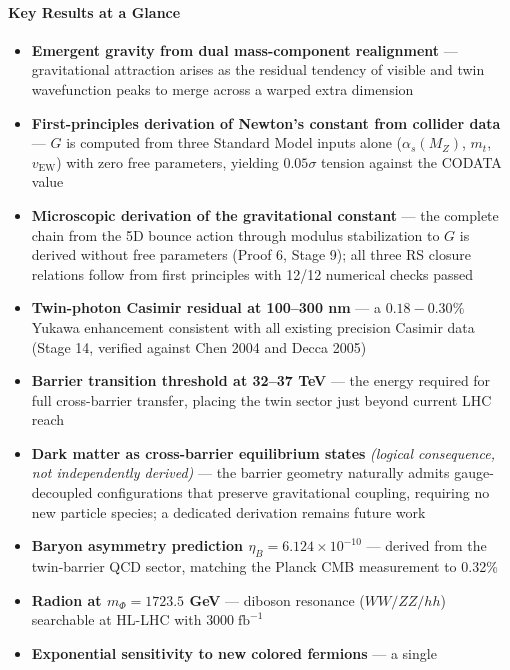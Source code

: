 \documentclass[
  11pt,
]{article}
\providecommand{\tightlist}{%
  \setlength{\itemsep}{0pt}\setlength{\parskip}{0pt}}
\begin{document}
\hypertarget{key-results-at-a-glance}{%
\paragraph{Key Results at a Glance}\label{key-results-at-a-glance}}

\begin{itemize}
\tightlist
\item
  \textbf{Emergent gravity from dual mass-component realignment} ---
  gravitational attraction arises as the residual tendency of visible
  and twin wavefunction peaks to merge across a warped extra dimension
\item
  \textbf{First-principles derivation of Newton's constant from collider
  data} --- \(G\) is computed from three Standard Model inputs alone
  (\(\alpha_s(M_Z)\), \(m_t\), \(v_{\text{EW}}\)) with zero free
  parameters, yielding \(0.05\sigma\) tension against the CODATA value
\item
  \textbf{Microscopic derivation of the gravitational constant} --- the
  complete chain from the 5D bounce action through modulus stabilization
  to \(G\) is derived without free parameters (Proof 6, Stage 9); all
  three RS closure relations follow from first principles with 12/12
  numerical checks passed
\item
  \textbf{Twin-photon Casimir residual at 100--300 nm} --- a
  \(0.18{-}0.30\%\) Yukawa enhancement consistent with all existing
  precision Casimir data (Stage 14, verified against Chen 2004 and Decca
  2005)
\item
  \textbf{Barrier transition threshold at 32--37 TeV} --- the energy
  required for full cross-barrier transfer, placing the twin sector just
  beyond current LHC reach
\item
  \textbf{Dark matter as cross-barrier equilibrium states}
  \emph{(logical consequence, not independently derived)} --- the
  barrier geometry naturally admits gauge-decoupled configurations that
  preserve gravitational coupling, requiring no new particle species; a
  dedicated derivation remains future work
\item
  \textbf{Baryon asymmetry prediction
  \(\eta_B = 6.124 \times 10^{-10}\)} --- derived from the twin-barrier
  QCD sector, matching the Planck CMB measurement to 0.32\%
\item
  \textbf{Radion at \(m_\Phi = 1723.5\) GeV} --- diboson resonance
  (\(WW/ZZ/hh\)) searchable at HL-LHC with \(3000\;\text{fb}^{-1}\)
\item
  \textbf{Exponential sensitivity to new colored fermions} --- a single

\end{itemize}
\end{document}
